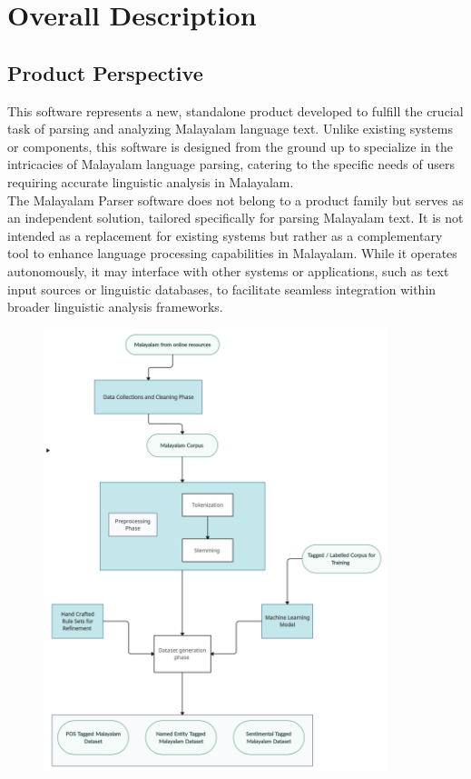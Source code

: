 \documentclass[12pt]{article}
\begin{document}
	\section{Overall Description}
	
	\subsection{Product Perspective}
	This software represents a new, standalone product
	developed to fulfill the crucial task of parsing and analyzing Malayalam language text.
	Unlike existing systems or components, this software is designed from the ground up to
	specialize in the intricacies of Malayalam language parsing, catering to the specific needs
	of users requiring accurate linguistic analysis in Malayalam.\\
	The Malayalam Parser software does not belong to a product family but serves as an
	independent solution, tailored specifically for parsing Malayalam text. It is not intended as
	a replacement for existing systems but rather as a complementary tool to enhance
	language processing capabilities in Malayalam. While it operates autonomously, it may
	interface with other systems or applications, such as text input sources or linguistic
	databases, to facilitate seamless integration within broader linguistic analysis frameworks.
	
	\begin{figure}[t]
		\centering
		\includegraphics[width=10cm]{architecture.png}
	\end{figure}
	
\end{document}
